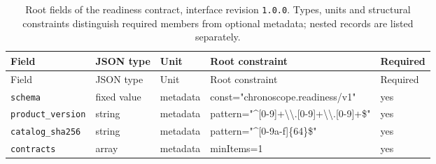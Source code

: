 \begingroup\small
\begin{longtable}{@{}p{}p{}p{}p{}p{}@{}}
\caption{Root fields of the readiness contract, interface revision \texttt{1.0.0}. Types, units and structural constraints distinguish required members from optional metadata; nested records are listed separately.}\label{tab:contract-readiness}\\
\toprule Field & JSON type & Unit & Root constraint & Required\\\midrule\endfirsthead
\toprule Field & JSON type & Unit & Root constraint & Required\\\midrule\endhead
\texttt{schema} & fixed value & metadata & const="chronosco\allowbreak{}pe.readiness/v1" & yes\\
\texttt{product\_\allowbreak{}version} & string & metadata & pattern="\textasciicircum{}[0-9]+\allowbreak{}\textbackslash{}\textbackslash{}.[0-9]+\textbackslash{}\textbackslash{}.[0-9\allowbreak{}]+\$" & yes\\
\texttt{catalog\_\allowbreak{}sha256} & string & metadata & pattern="\textasciicircum{}[0-9a-f]\{64\}\$" & yes\\
\texttt{contracts} & array & metadata & minItems=1 & yes\\
\bottomrule
\end{longtable}
\endgroup
